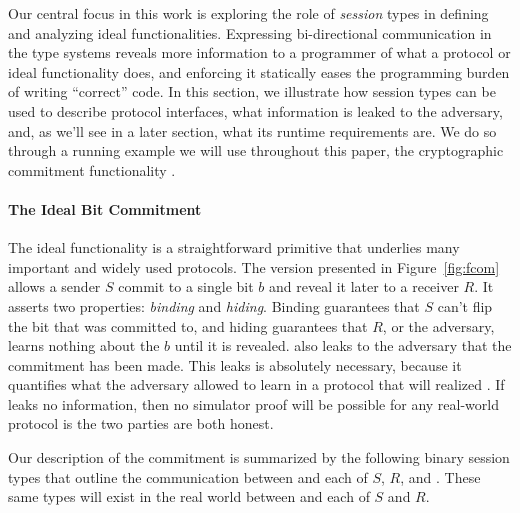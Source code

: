 
Our central focus in this work is exploring the role of \emph{session} types in defining and analyzing ideal functionalities.
Expressing bi-directional communication in the type systems reveals more information to a programmer of what a protocol or ideal functionality does, and enforcing it statically eases the programming burden of writing ``correct'' code.
In this section, we illustrate how session types can be used to describe protocol interfaces, what information is leaked to the adversary, and, as we'll see in a later section, what its runtime requirements are.
We do so through a running example we will use throughout this paper, the cryptographic commitment functionality \Fcom.

\paragraph{The Ideal Bit Commitment}
The ideal functionality \Fcom is a straightforward primitive that underlies many important and widely used protocols. 
The version presented in Figure~\ref{fig:fcom} allows a sender $S$ commit to a single bit $b$ and reveal it later to a receiver $R$.
It asserts two properties: \emph{binding} and \emph{hiding}.
Binding guarantees that $S$ can't flip the bit that was committed to, and hiding guarantees that $R$, or the adversary, learns nothing about the $b$ until it is revealed.
\Fcom also leaks to the adversary that the commitment has been made.
This leaks is absolutely necessary, because it quantifies what the adversary allowed to learn in a protocol that will realized \Fcom. 
If \Fcom leaks no information, then no simulator proof will be possible for any real-world protocol is the two parties are both honest.



Our description of the commitment is summarized by the following binary session types that outline the communication between \Fcom and each of $S$, $R$, and \A.
These same types will exist in the real world between \Z and each of $S$ and $R$.


